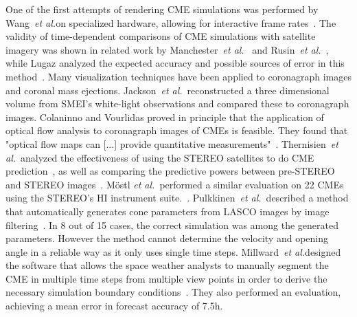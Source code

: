 \documentclass[journal]{vgtc}                %
\def\etal{\textit{et al.}}
\def\etal{\textit{et al.}}
\begin{document}
 One of the first attempts of rendering CME simulations was performed by Wang~\etal on specialized hardware, allowing for interactive frame rates~\cite{wang2004visualization}. The validity of time-dependent comparisons of CME simulations with satellite imagery was shown in related work by Manchester~\etal ~\cite{manchester2008three} and Rusin~\etal ~\cite{rusin2010comparing}, while Lugaz analyzed the expected accuracy and possible sources of error in this method~\cite{lugaz2010accuracy}. Many visualization techniques have been applied to coronagraph images and coronal mass ejections. Jackson~\etal\ reconstructed a three dimensional volume from SMEI's white-light observations and compared these to coronagraph images. Colaninno and Vourlidas proved in principle that the application of optical flow analysis to coronagraph images of CMEs is feasible. They found that "optical flow maps can [...] provide quantitative measurements"~\cite{Colaninno:2006ef}. Thernisien~\etal\ analyzed the effectiveness of using the STEREO satellites to do CME prediction~\cite{Thernisien:2009hx}, as well as comparing the predictive powers between pre-STEREO and STEREO images~\cite{Thernisien:2011fl}. M\"ostl \etal\ performed a similar evaluation on 22 CMEs using the STEREO's HI instrument suite.~\cite{Mostl:2014iv}. Pulkkinen~\etal\ described a method that automatically generates cone parameters from LASCO images by image filtering~\cite{Pulkkinen:2009gb}. In 8 out of 15 cases, the correct simulation was among the generated parameters. However the method cannot determine the velocity and opening angle in a reliable way as it only uses single time steps. Millward~\etal designed the software that allows the space weather analysts to manually segment the CME in multiple time steps from multiple view points in order to derive the necessary simulation boundary conditions~\cite{Millward:2013cm}. They also performed an evaluation, achieving a mean error in forecast accuracy of 7.5h.
\end{document}
